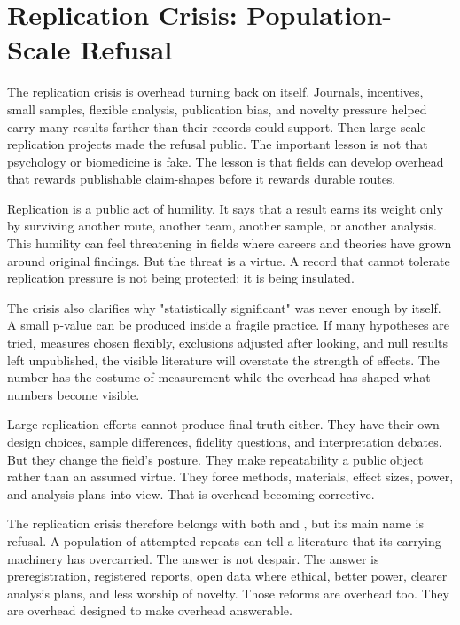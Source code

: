 \section{Replication Crisis: Population-Scale Refusal}

The replication crisis is overhead turning back on itself. Journals,
incentives, small samples, flexible analysis, publication bias, and novelty
pressure helped carry many results farther than their records could support.
Then large-scale replication projects made the refusal public. The important
lesson is not that psychology or biomedicine is fake. The lesson is that
fields can develop overhead that rewards publishable claim-shapes before it
rewards durable routes.

Replication is a public act of humility. It says that a result earns its
weight only by surviving another route, another team, another sample, or
another analysis. This humility can feel threatening in
fields where careers and theories have grown around original findings. But the
threat is a virtue. A record that cannot tolerate replication pressure is not
being protected; it is being insulated.

The crisis also clarifies why "statistically significant" was never enough by
itself. A small p-value can be produced inside a fragile practice. If many
hypotheses are tried, measures chosen flexibly, exclusions adjusted after
looking, and null results left unpublished, the visible literature will
overstate the strength of effects. The number has the costume of measurement
while the overhead has shaped what numbers become visible.

Large replication efforts cannot produce final truth either. They have their
own design choices, sample differences, fidelity questions, and interpretation
debates. But they change the field's posture. They make repeatability a public
object rather than an assumed virtue. They force methods, materials, effect
sizes, power, and analysis plans into view. That is overhead becoming
corrective.

The replication crisis therefore belongs with both  and
, but its main name is refusal. A population of attempted repeats
can tell a literature that its carrying machinery has overcarried. The answer
is not despair. The answer is preregistration, registered reports, open data
where ethical, better power, clearer analysis plans, and less worship of
novelty. Those reforms are overhead too. They are overhead designed to make
overhead answerable.

